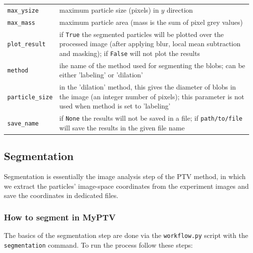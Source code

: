 \documentclass[10pt,a4paper]{article}
\begin{document}
\begin{table}[!ht]
\begin{tabular}{l m{13cm}}
		\texttt{max\_ysize} & maximum particle size (pixels) in $y$ direction \\[.3em]
		
		\texttt{max\_mass} & maximum particle area (mass is the sum of pixel grey values) \\[.3em]
		
		\texttt{plot\_result} & if \texttt{True} the segmented particles will be plotted over the processed image (after applying blur, local mean subtraction and masking); if \texttt{False} will not plot the results \\[.3em]
		
		\texttt{method} & ihe name of the method used for segmenting the blobs; can be either 'labeling' or 'dilation' \\
		
		\texttt{particle\_size} & in the 'dilation' method, this gives the diameter of blobs in the image (an integer number of pixels); this parameter is not used when method is set to 'labeling' \\
		
		\texttt{save\_name} & if \texttt{None} the results will not be saved in a file; if \texttt{path/to/file} will save the results in the given file name \\
		
		\hline
	\end{tabular}
\end{table}




\subsection{Segmentation}\label{sec:workflow_segment}


Segmentation is essentially the image analysis step of the PTV method, in which we extract the particles' image-space coordinates from the experiment images and save the coordinates in dedicated files. 


\subsubsection{How to segment in MyPTV}

The basics of the segmentation step are done via the \texttt{workflow.py} script with the \texttt{segmentation} command. To run the process follow these steps:
\end{document}
